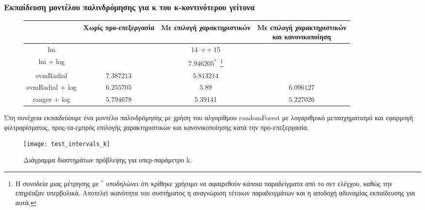 \subsubsection{Εκπαίδευση μοντέλου παλινδρόμησης για κ του κ-κοντινότερου γείτονα} 
\begin{figure}[!htb]
	\footnotesize
	\begin{center}
		\begin{tabular}{ |c|c|c|c| } 
			\hline
			& Χωρίς προ-επεξεργασία & Με επιλογή χαρακτηριστικών & \pbox{20cm}{Με επιλογή χαρακτηριστικών\\ και κανονικοποίηση} \\
			\hline
			lm &  & $14 \cdot e+15$ &   \\
			\hline
			lm + log & & $7.946205 ^{*}$~\footnote{Η συνοδεία μιας μέτρησης με $^*$ υποδηλώνει ότι κρίθηκε χρήσιμο να αφαιρεθούν κάποια παραδείγματα από το σετ ελέγχου, καθώς την επηρέαζαν υπερβολικά. Αποτελεί ικανότητα του συστήματος η αναγνώριση τέτοιων παραδειγμάτων και η αποδοχή αδυναμίας εκπαίδευσης για αυτά. }& \\
			\hline
			svmRadial & $7.387213$ &$5.813214$& \\
			\hline
			svmRadial + log& $6.255705$ & $5.89$& $6.096127$\\
			\hline
			ranger + log  & $5.794678$ & 5.39141 & $5.227026$\\
			\hline
		\end{tabular}   
	\end{center}
\end{figure}

Στη συνέχεια εκπαιδεύουμε ένα μοντέλο παλινδρόμησης με χρήση του αλγορίθμου randomForest με λογαριθμικό μετασχηματισμό και εφαρμογή φιλτραρίσματος, προς-τα-εμπρός επιλογής χαρακτηριστικών και κανονικοποίησης κατά την προ-επεξεργασία.

\begin{figure}[!htb]
	\texttt{[image: test\_intervals\_k]}
		\caption[Διάγραμμα διαστημάτων πρόβλεψης για υπερ-παράμετρο decay]{Διάγραμμα διαστημάτων πρόβλεψης για υπερ-παράμετρο k.}	
	\label{fig:high} 
\end{figure}
\FloatBarrier
